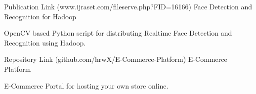 

\begin{cventries}

  \cventry
    {Publication Link (www.ijraset.com/fileserve.php?FID=16166)} %
    {Face Detection and Recognition for Hadoop} %
    {} %
    {} %
    {
      \begin{cvitems} %
        \item {OpenCV based Python script for distributing Realtime Face Detection and Recognition using Hadoop.}
      \end{cvitems}
    }

  \cventry
    {Repository Link (github.com/hrwX/E-Commerce-Platform)} %
    {E-Commerce Platform} %
    {} %
    {} %
    {
      \begin{cvitems} %
        \item {E-Commerce Portal for hosting your own store online.}
      \end{cvitems}
    }

\end{cventries}

